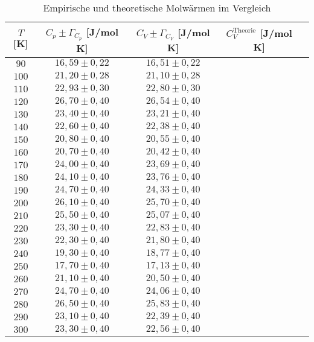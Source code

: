 \begin{table}[H]
  \centering
  \begin{tabular}{ccccc}
    \toprule
    $T$ [K] & $C_p \pm \Gamma_{C_p} $ [J/mol K]
    & $C_V \pm \Gamma_{C_V} $ [J/mol K] & $C_{V}^{\text{Theorie}}$ [J/mol K] \\
    \midrule
    $ 90$ & $16,59 \pm 0,22$ & $16,51 \pm 0,22$ &  \\
    $100$ & $21,20 \pm 0,28$ & $21,10 \pm 0,28$ &  \\
    $110$ & $22,93 \pm 0,30$ & $22,80 \pm 0,30$ &  \\
    $120$ & $26,70 \pm 0,40$ & $26,54 \pm 0,40$ &  \\
    $130$ & $23,40 \pm 0,40$ & $23,21 \pm 0,40$ &  \\
    $140$ & $22,60 \pm 0,40$ & $22,38 \pm 0,40$ &  \\
    $150$ & $20,80 \pm 0,40$ & $20,55 \pm 0,40$ &  \\
    $160$ & $20,70 \pm 0,40$ & $20,42 \pm 0,40$ &  \\
    $170$ & $24,00 \pm 0,40$ & $23,69 \pm 0,40$ &  \\
    $180$ & $24,10 \pm 0,40$ & $23,76 \pm 0,40$ &  \\
    $190$ & $24,70 \pm 0,40$ & $24,33 \pm 0,40$ &  \\
    $200$ & $26,10 \pm 0,40$ & $25,70 \pm 0,40$ &  \\
    $210$ & $25,50 \pm 0,40$ & $25,07 \pm 0,40$ &  \\
    $220$ & $23,30 \pm 0,40$ & $22,83 \pm 0,40$ &  \\
    $230$ & $22,30 \pm 0,40$ & $21,80 \pm 0,40$ &  \\
    $240$ & $19,30 \pm 0,40$ & $18,77 \pm 0,40$ &  \\
    $250$ & $17,70 \pm 0,40$ & $17,13 \pm 0,40$ &  \\
    $260$ & $21,10 \pm 0,40$ & $20,50 \pm 0,40$ &  \\
    $270$ & $24,70 \pm 0,40$ & $24,06 \pm 0,40$ &  \\
    $280$ & $26,50 \pm 0,40$ & $25,83 \pm 0,40$ &  \\
    $290$ & $23,10 \pm 0,40$ & $22,39 \pm 0,40$ &  \\
    $300$ & $23,30 \pm 0,40$ & $22,56 \pm 0,40$ &  \\
    \bottomrule
  \end{tabular}
  \caption{Empirische und theoretische Molwärmen im Vergleich}
  \label{tab:2}
\end{table}

